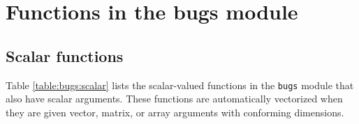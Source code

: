 \documentclass[11pt, a4paper, titlepage]{report}
\begin{document}
\section{Functions in the bugs module}
\label{section:functions:bugs}

\subsection{Scalar functions}

Table \ref{table:bugs:scalar} lists the scalar-valued functions in the
\texttt{bugs} module that also have scalar arguments.  These functions
are automatically vectorized when they are given vector, matrix, or
array arguments with conforming dimensions.


\end{document}
